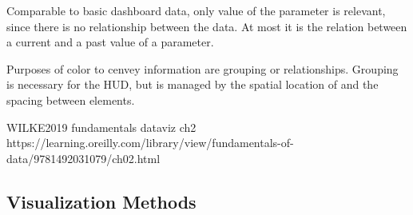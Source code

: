 Comparable to basic dashboard data, only value of the parameter is relevant, since there is no relationship between the data. At most it is the relation between a current and a past value of a parameter.

Purposes of color to cenvey information are grouping or relationships. Grouping is necessary for the HUD, but is managed by the spatial location of and the spacing between elements.

WILKE2019 fundamentals dataviz ch2
https://learning.oreilly.com/library/view/fundamentals-of-data/9781492031079/ch02.html

\subsection{Visualization Methods}
